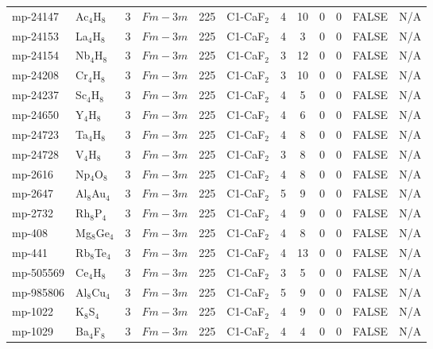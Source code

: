 {\begin{longtable}{llcccccccccc}
    mp-24147 & Ac$_{4}$H$_{8}$ & 3     & $Fm-3m$ & 225   & C1-CaF$_{2}$ & 4     & 10    & 0     & 0     & FALSE & N/A \\
    mp-24153 & La$_{4}$H$_{8}$ & 3     & $Fm-3m$ & 225   & C1-CaF$_{2}$ & 4     & 3     & 0     & 0     & FALSE & N/A \\
    mp-24154 & Nb$_{4}$H$_{8}$ & 3     & $Fm-3m$ & 225   & C1-CaF$_{2}$ & 3     & 12    & 0     & 0     & FALSE & N/A \\
    mp-24208 & Cr$_{4}$H$_{8}$ & 3     & $Fm-3m$ & 225   & C1-CaF$_{2}$ & 3     & 10    & 0     & 0     & FALSE & N/A \\
    mp-24237 & Sc$_{4}$H$_{8}$ & 3     & $Fm-3m$ & 225   & C1-CaF$_{2}$ & 4     & 5     & 0     & 0     & FALSE & N/A \\
    mp-24650 & Y$_{4}$H$_{8}$ & 3     & $Fm-3m$ & 225   & C1-CaF$_{2}$ & 4     & 6     & 0     & 0     & FALSE & N/A \\
    mp-24723 & Ta$_{4}$H$_{8}$ & 3     & $Fm-3m$ & 225   & C1-CaF$_{2}$ & 4     & 8     & 0     & 0     & FALSE & N/A \\
    mp-24728 & V$_{4}$H$_{8}$ & 3     & $Fm-3m$ & 225   & C1-CaF$_{2}$ & 3     & 8     & 0     & 0     & FALSE & N/A \\
    mp-2616 & Np$_{4}$O$_{8}$ & 3     & $Fm-3m$ & 225   & C1-CaF$_{2}$ & 4     & 8     & 0     & 0     & FALSE & N/A \\
    mp-2647 & Al$_{8}$Au$_{4}$ & 3     & $Fm-3m$ & 225   & C1-CaF$_{2}$ & 5     & 9     & 0     & 0     & FALSE & N/A \\
    mp-2732 & Rh$_{8}$P$_{4}$ & 3     & $Fm-3m$ & 225   & C1-CaF$_{2}$ & 4     & 9     & 0     & 0     & FALSE & N/A \\
    mp-408 & Mg$_{8}$Ge$_{4}$ & 3     & $Fm-3m$ & 225   & C1-CaF$_{2}$ & 4     & 8     & 0     & 0     & FALSE & N/A \\
    mp-441 & Rb$_{8}$Te$_{4}$ & 3     & $Fm-3m$ & 225   & C1-CaF$_{2}$ & 4     & 13    & 0     & 0     & FALSE & N/A \\
    mp-505569 & Ce$_{4}$H$_{8}$ & 3     & $Fm-3m$ & 225   & C1-CaF$_{2}$ & 3     & 5     & 0     & 0     & FALSE & N/A \\
    mp-985806 & Al$_{8}$Cu$_{4}$ & 3     & $Fm-3m$ & 225   & C1-CaF$_{2}$ & 5     & 9     & 0     & 0     & FALSE & N/A \\
    mp-1022 & K$_{8}$S$_{4}$ & 3     & $Fm-3m$ & 225   & C1-CaF$_{2}$ & 4     & 9     & 0     & 0     & FALSE & N/A \\
    mp-1029 & Ba$_{4}$F$_{8}$ & 3     & $Fm-3m$ & 225   & C1-CaF$_{2}$ & 4     & 4     & 0     & 0     & FALSE & N/A \\

\end{longtable}}
